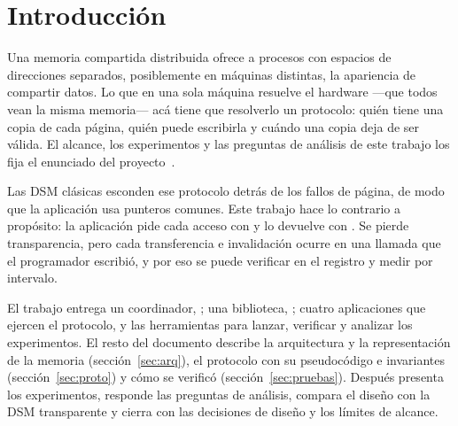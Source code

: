 \section{Introducción}

Una memoria compartida distribuida ofrece a procesos con espacios de
direcciones separados, posiblemente en máquinas distintas, la apariencia de
compartir datos. Lo que en una sola máquina resuelve el hardware ---que todos
vean la misma memoria--- acá tiene que resolverlo un protocolo: quién tiene
una copia de cada página, quién puede escribirla y cuándo una copia deja de
ser válida. El alcance, los experimentos y las preguntas de análisis de este
trabajo los fija el enunciado del proyecto~\cite{enunciado2026}.

Las DSM clásicas esconden ese protocolo detrás de los fallos de página, de
modo que la aplicación usa punteros comunes. Este trabajo hace lo contrario a
propósito: la aplicación pide cada acceso con  y lo
devuelve con . Se pierde transparencia, pero cada
transferencia e invalidación ocurre en una llamada que el programador
escribió, y por eso se puede verificar en el registro y medir por intervalo.

El trabajo entrega un coordinador, ; una biblioteca,
; cuatro aplicaciones que ejercen el protocolo, y las herramientas
para lanzar, verificar y analizar los experimentos. El resto del documento
describe la arquitectura y la representación de la memoria
(sección~\ref{sec:arq}), el protocolo con su pseudocódigo e invariantes
(sección~\ref{sec:proto}) y cómo se verificó (sección~\ref{sec:pruebas}).
Después presenta los experimentos, responde las preguntas de análisis, compara
el diseño con la DSM transparente y cierra con las decisiones de diseño y los
límites de alcance.
